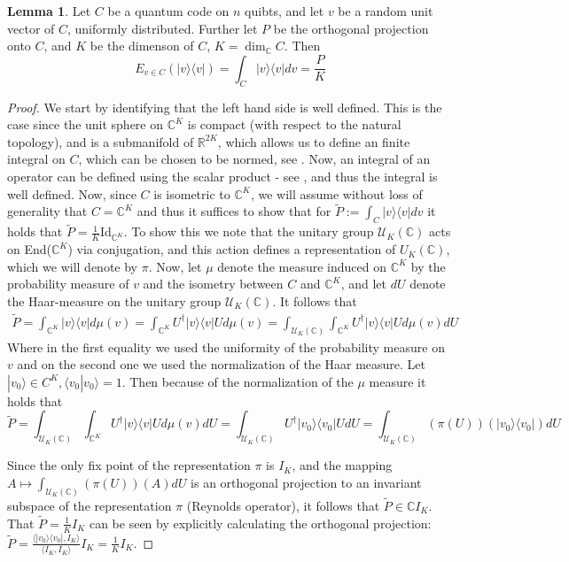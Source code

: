 \documentclass{article}
\def\R{\mathbb{R}}
\def\C{\mathbb{C}}
\def\U{\mathcal{U}}
\def\Id{\text{Id}}
\theoremstyle{definition}
\newtheorem{lem}[Satz]{Lemma}
\begin{document}
\begin{lem}\label{expvalproj}
Let $C$ be a quantum code on $n$ quibts, and let $v$ be a random unit vector of $C$, uniformly distributed. Further let $P$ be the orthogonal projection onto $C$, and $K$ be the dimenson of $C$, $K = \dim_\C C$.
Then \begin{equation} E_{v \in C}(|v\rangle \langle v |) = \int_C |v \rangle \langle v | dv = \frac{P}{K} \end{equation}
\begin{proof}
 We start by identifying that the left hand side is well defined. This is the case since the unit sphere on $\C^K$ is compact (with respect to the natural topology), and is a submanifold of $\R^{2K}$, 
 which allows us to define an finite integral on $C$, which can be chosen to be normed, see \cite{foerster}. Now, an integral of an operator can be defined using the scalar product - see \cite{harmana}, and thus the integral is well defined.
 Now, since $C$ is isometric to $\C^K$, we will assume without loss of generality that $C = \C^K$ and thus it suffices to show that for $\tilde P := \int_C |v \rangle \langle v | dv$ it holds that $\tilde P = \frac{1}{K} \Id_{\C^K}$.
To show this we note that the unitary group $\U_K(\C)$ acts on End($\C^K$) via conjugation, and this action defines a representation of $U_K(\C)$, which we will denote by $\pi$. Now, let $\mu$ denote the measure induced on $\C^K$ by the probability measure of $v$ and the isometry
between $C$ and $\C^K$, and let $dU$ denote the Haar-measure on the unitary group $\U_K(\C)$. It follows that
\begin{align}
\tilde P = \int_{\C^K} |v \rangle \langle v | d \mu(v) = \int_{\C^K} U^\dagger |v \rangle \langle v | U d \mu(v) = \int_{\U_K(\C)} \int_{\C^K} U^\dagger |v \rangle \langle v | U d \mu(v) dU
\end{align}
Where in the first equality we used the uniformity of the probability measure on $v$ and on the second one we used the normalization of the Haar measure. Let $ |v_0 \rangle \in C^K, \langle v_0 | v_0 \rangle = 1$. Then because of the normalization of the $\mu$ measure it holds that
\begin{equation}
\tilde P = \int_{\U_K(\C)} \int_{\C^K} U^\dagger |v \rangle \langle v | U d \mu(v) dU = \int_{\U_K(\C)} U^\dagger |v_0 \rangle \langle v_0 | U dU =  \int_{\U_K(\C)} (\pi(U))( |v_0 \rangle \langle v_0 | ) dU
\end{equation}

Since the only fix point of the representation $\pi$ is $I_K$, and the mapping $A \mapsto \int_{\U_K(\C)} (\pi(U))(A) dU$ is an orthogonal projection to an invariant subspace of the representation $\pi$ (Reynolds operator), it follows that
$\tilde P \in \C I_K$. That $\tilde P = \frac{1}{K} I_K$ can be seen by explicitly calculating the orthogonal projection: $\tilde P = \frac{\langle |v_0 \rangle \langle v_0 |, I_K \rangle}{ \langle I_K, I_K \rangle} I_K = \frac{1}{K} I_K$.
\end{proof}
\end{lem}
\end{document}
